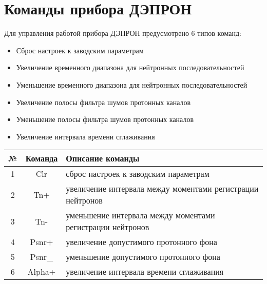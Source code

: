 \section{Команды прибора ДЭПРОН}



Для управления работой прибора ДЭПРОН предусмотрено 6 типов команд:

\begin{itemize}
	\item 	Сброс настроек к заводским параметрам

	\item Увеличение временного диапазона для нейтронных последовательностей

	\item Уменьшение временного диапазона для нейтронных последовательностей

	\item Увеличение полосы фильтра шумов протонных каналов

	\item Уменьшение полосы фильтра шумов протонных каналов

	\item Увеличение интервала времени сглаживания

\end{itemize}


\small
\begin{center}
	\begin{tabularx}{\textwidth}{|c|c|X|}
		\hline
		№ & Команда & Описание команды                                           \\ \hline
		1 &   Clr   & сброс настроек к заводским параметрам                      \\ \hline
		2 &   Tn+   & увеличение интервала между моментами регистрации нейтронов \\ \hline
		3 &   Tn-   & уменьшение интервала между моментами регистрации нейтронов \\ \hline
		4 &  Psnr+  & увеличение допустимого протонного фона                     \\ \hline
		5 & Psnr\_  & уменьшение допустимого протонного фона                     \\ \hline
		6 & Alpha+  & увеличение интервала времени сглаживания                   \\ \hline
	\end{tabularx}  
\end{center}
\normalsize



